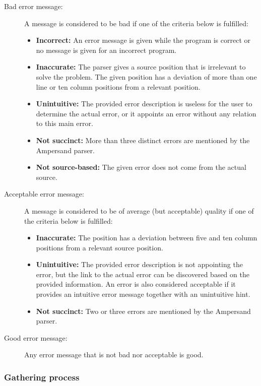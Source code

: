 \begin{description}
	\item [Bad error message:] A message is considered to be bad if one of the criteria below is fulfilled:
		\begin{itemize}
			\item \textbf{Incorrect:} An error message is given while the program is correct or no message is given for an incorrect program.
			\item \textbf{Inaccurate:}
        The parser gives a source position that is irrelevant to solve the problem.
        The given position has a deviation of more than one line or ten column positions from a relevant position.
			\item \textbf{Unintuitive:}
					The provided error description is useless for the user to determine the actual error, or it appoints an error without any relation to this main error.
			\item \textbf{Not succinct:}
        More than three distinct errors are mentioned by the Ampersand parser.
      \item \textbf{Not source-based:}
        The given error does not come from the actual source.
		\end {itemize}
	\item [Acceptable error message:] A message is considered to be of average (but acceptable) quality if one of the criteria below is fulfilled:
		\begin{itemize}
			\item \textbf{Inaccurate:}
			The position has a deviation between five and ten column positions from a relevant source position.
			\item \textbf{Unintuitive:}
        The provided error description is not appointing the error, but the link to the actual error can be discovered based on the provided information.
        An error is also considered acceptable if it provides an intuitive error message together with an unintuitive hint.
			\item \textbf{Not succinct:}
        Two or three errors are mentioned by the Ampersand parser.
		\end {itemize}
		
	\item [Good error message:] Any error message that is not bad nor acceptable is good.
\end {description}

\subsubsection{Gathering process}

